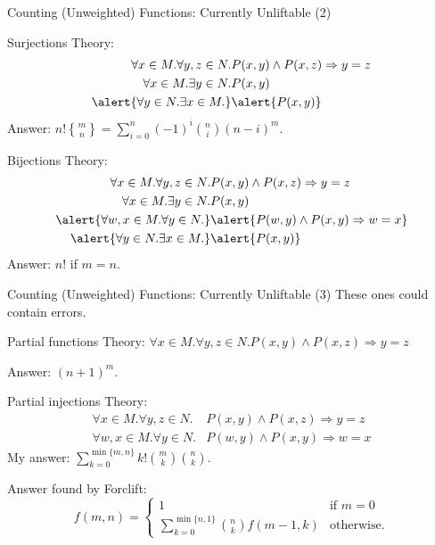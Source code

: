 \documentclass{beamer}
\DeclareRobustCommand{\stirling}{\genfrac\{\}{0pt}{}}
\begin{document}
\begin{frame}{Counting (Unweighted) Functions: Currently Unliftable (2)}
  \begin{block}{Surjections}
    Theory:
    \begin{align*}
      \forall x \in M. \forall y, z \in N. &P(x, y) \land P(x, z) \Rightarrow y=z \\
      \forall x \in M. \exists y \in N. &P(x, y) \\
      \alert{\forall y \in N. \exists x \in M.} &\alert{P(x, y)}
    \end{align*}
    Answer: $n!\stirling{m}{n} = \sum_{i=0}^n (-1)^i\binom{n}{i}(n-i)^m$.
  \end{block}
  \begin{block}{Bijections}
    Theory:
    \begin{align*}
      \forall x \in M. \forall y, z \in N. &P(x, y) \land P(x, z) \Rightarrow y=z \\
      \forall x \in M. \exists y \in N. &P(x, y) \\
      \alert{\forall w, x \in M. \forall y \in N.} &\alert{P(w, y) \land P(x, y) \Rightarrow w=x} \\
      \alert{\forall y \in N. \exists x \in M.} &\alert{P(x, y)}
    \end{align*}
    Answer: $n!$ if $m=n$.
  \end{block}
\end{frame}

\begin{frame}{Counting (Unweighted) Functions: Currently Unliftable (3)}
  These ones could contain errors.
  \begin{block}{Partial functions}
    Theory: $\forall x \in M. \forall y, z \in N. P(x, y) \land P(x, z)
    \Rightarrow y=z$

    Answer: $(n+1)^m$.
  \end{block}
  \begin{block}{Partial injections}
    Theory:
    \begin{align*}
      \forall x \in M. \forall y, z \in N. &P(x, y) \land P(x, z) \Rightarrow y=z \\
      \forall w, x \in M. \forall y \in N. &P(w, y) \land P(x, y) \Rightarrow w=x
    \end{align*}
    My answer: $\sum_{k=0}^{\min\{m, n\}} k!\binom{m}{k}\binom{n}{k}$.

    \pause
    \alert{Answer found by Forclift:}
    \[
    f(m, n) =
    \begin{cases}
      1 & \text{if } m = 0 \\
      \sum_{k=0}^{\min\{n, 1\}} \binom{n}{k} f(m-1, k) & \text{otherwise.}
    \end{cases}
    \]
  \end{block}
\end{frame}
\end{document}
